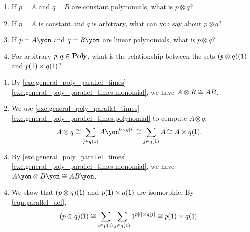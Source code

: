 \documentclass[Book-Poly]{subfiles}
\begin{document}
\begin{exercise} \label{exc.some_parallel_prods}
\begin{enumerate}
	\item \label{exc.some_parallel_prods.const} If $p=A$ and $q=B$ are constant polynomials, what is $p\otimes q$?
	\item If $p=A$ is constant and $q$ is arbitrary, what can you say about $p\otimes q$?
	\item \label{exc.some_parallel_prods.lin} If $p=A\yon$ and $q=B\yon$ are linear polynomials, what is $p\otimes q$?
	\item \label{exc.some_parallel_prods.pos_prod} For arbitrary $p,q\in\mathbf{Poly}$, what is the relationship between the sets $(p\otimes q)(\textsf{1})$ and $p(\textsf{1})\times q(\textsf{1})$?
\qedhere
\end{enumerate}
\begin{solution}
\begin{enumerate}
    \item By \cref{exc.general_poly_parallel_times} \cref{exc.general_poly_parallel_times.monomial}, we have $A \otimes B \cong AB$.
    \item We use \cref{exc.general_poly_parallel_times} \cref{exc.general_poly_parallel_times.polynomial} to compute $A \otimes q$:
    \[
        A \otimes q \iso \sum_{j \in q(\1)} A\yon^{\0 \times q[i]} \iso \sum_{j \in q(\1)} A \iso A \times q(\1).
    \]
    \item By \cref{exc.general_poly_parallel_times} \cref{exc.general_poly_parallel_times.monomial}, we have $A\yon \otimes B\yon \iso AB\yon$.
    \item We show that $(p\otimes q)(\textsf{1})$ and $p(\textsf{1})\times q(\textsf{1})$ are isomorphic. By \eqref{eqn.parallel_def},
    \[
        (p \otimes q)(\textsf{1}) \cong \sum_{i \in p(\textsf{1})} \sum_{j \in q(\textsf{1})} \textsf{1}^{p[i] \times q[j]} \cong p(\textsf{1}) \times q(\textsf{1}).
    \]
\end{enumerate}
\end{solution}
\end{exercise}
\end{document}
